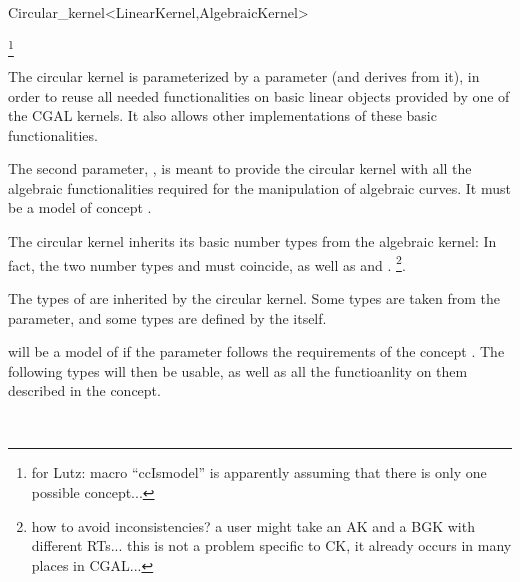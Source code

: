 \begin{ccRefClass}{Circular_kernel<LinearKernel,AlgebraicKernel>}

\ccDefinition


\ccIsModel

\footnote{for Lutz: macro ``ccIsmodel'' is
apparently assuming that there is only one possible concept...}

\ccParameters

The circular kernel is parameterized by a  parameter
(and derives from it), in order to reuse all needed functionalities on
basic linear objects provided by one of the CGAL kernels. It also
allows other implementations of these basic functionalities.

The second parameter, , is meant to provide the
circular kernel with all the algebraic functionalities required for the
manipulation of algebraic curves. 
It must be a model of concept . 

\ccInheritsFrom


\ccTypes

\ccThreeToTwo

The circular kernel inherits its basic number types from the algebraic kernel:
In fact, the two number types  and
 must coincide, as well as
 and .
\footnote{how to avoid inconsistencies? a user might take an AK and a
BGK with different RTs... this is not a problem specific to CK, it already occurs 
in many places in CGAL...}. 

The types of  are inherited by the circular kernel.
Some types are taken from the  parameter, and
some types are defined by the  itself.

 will be a model of  if the 
 parameter follows the requirements of the 
concept . The following types will then be
usable, as well as all the functioanlity on them described in the
 concept. 

\ccGlue
{}
\ccGlue
{}

\ccSeeAlso

\\

\end{ccRefClass}
